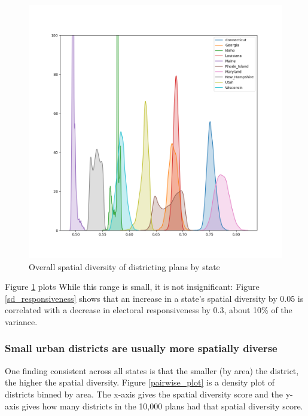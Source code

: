 \documentclass[]{article}
\begin{document}
\begin{figure}
\centering
\includegraphics{../30_results/all_plans_sd.png}
\caption{Overall spatial diversity of districting plans by state
\label{sd_plans}}
\end{figure}

Figure \ref{sd_plans} plots While this range is small, it is not
insignificant: Figure \ref{sd_responsiveness} shows that an increase in
a state's spatial diversity by 0.05 is correlated with a decrease in
electoral responsiveness by 0.3, about 10\% of the variance.

\hypertarget{small-urban-districts-are-usually-more-spatially-diverse}{%
\subsubsection{Small urban districts are usually more spatially
diverse}\label{small-urban-districts-are-usually-more-spatially-diverse}}

One finding consistent across all states is that the smaller (by area)
the district, the higher the spatial diversity. Figure
\ref{pairwise_plot} is a density plot of districts binned by area. The
x-axis gives the spatial diversity score and the y-axis gives how many
districts in the 10,000 plans had that spatial diversity score.
\end{document}

